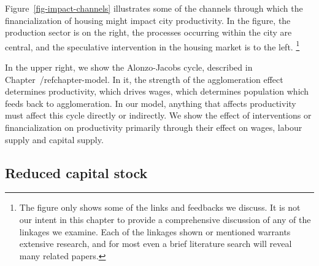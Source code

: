Figure~\ref{fig-impact-channels} illustrates some of the channels through which the financialization of housing might impact city productivity. 
In the figure, the production sector is on the right, the processes occurring within the city are central, and the speculative intervention in the housing market is to the left.  \footnote{The figure only shows some of the links and feedbacks we discuss. It is not our intent in this chapter to provide  a comprehensive discussion of any of the linkages we examine. Each of the linkages shown or mentioned warrants extensive research, and for most even a brief literature search will reveal many related papers.} 


In the upper right, we show the \gls{Alonzo-Jacobs cycle}, described in Chapter~/ref{chapter-model}. In it, the strength of the agglomeration effect determines productivity, which drives wages, which determines population which feeds back to agglomeration. In our model, anything that affects productivity must affect this cycle directly or indirectly.  We show the effect of interventions or financialization on productivity primarily through their effect on wages, labour supply and capital supply. %



\subsection{Reduced capital stock}

